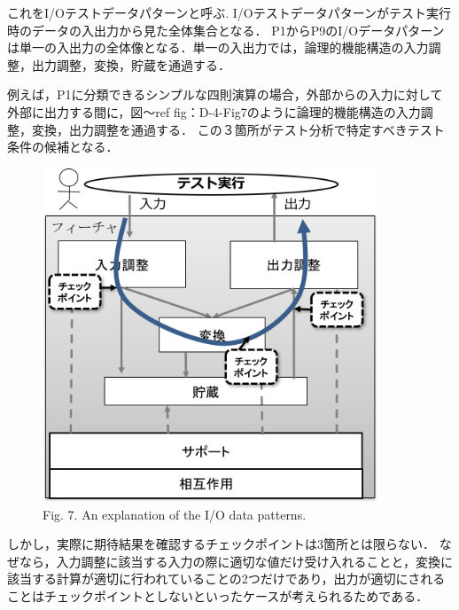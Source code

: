 \documentclass[a4paper,12pt]{jreport}
\begin{document}
これをI/Oテストデータパターンと呼ぶ.
I/Oテストデータパターンがテスト実行時のデータの入出力から見た全体集合となる．
P1からP9のI/Oデータパターンは単一の入出力の全体像となる．単一の入出力では，論理的機能構造の入力調整，出力調整，変換，貯蔵を通過する．

例えば，P1に分類できるシンプルな四則演算の場合，外部からの入力に対して外部に出力する間に，図〜ref {fig：D-4-Fig7}のように論理的機能構造の入力調整，変換，出力調整を通過する．
この３箇所がテスト分析で特定すべきテスト条件の候補となる．
  \begin{figure}[htbp]
 \begin{center}
 \includegraphics[width=10cm]{./image/D-4-Fig7.png}
 \caption{Fig. 7. An explanation of the I/O data patterns.}
 \label{fig:D-4-Fig7}
 \end{center}
  \end{figure}

しかし，実際に期待結果を確認するチェックポイントは3箇所とは限らない．
なぜなら，入力調整に該当する入力の際に適切な値だけ受け入れることと，変換に該当する計算が適切に行われていることの2つだけであり，出力が適切にされることはチェックポイントとしないといったケースが考えられるためである．
\end{document}

